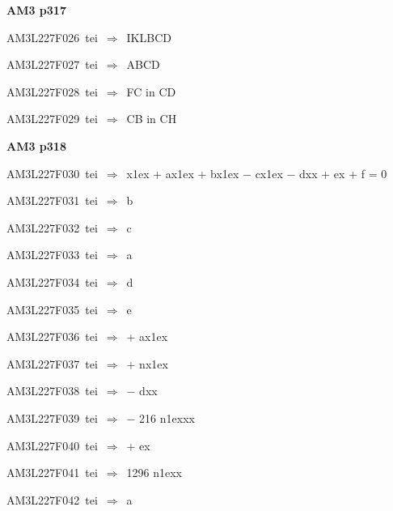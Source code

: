 \par\vfill\eject
{\bf\hfill AM3 p317\hfill\hbox{}}\par\bigskip
{\sixrm AM3L227F026\ {\sixit tei}\ }$\Rightarrow$\ IKLBCD\par\smallskip
{\sixrm AM3L227F027\ {\sixit tei}\ }$\Rightarrow$\ ABCD\par\smallskip
{\sixrm AM3L227F028\ {\sixit tei}\ }$\Rightarrow$\ FC {\tenit in} CD\par\smallskip
{\sixrm AM3L227F029\ {\sixit tei}\ }$\Rightarrow$\ CB {\tenit in} CH\par\smallskip

\par\vfill\eject
{\bf\hfill AM3 p318\hfill\hbox{}}\par\bigskip
{\sixrm AM3L227F030\ {\sixit tei}\ }$\Rightarrow$\ {\tenit x}\raise1ex\hbox{} + {\tenit ax}\raise1ex\hbox{} + {\tenit bx}\raise1ex\hbox{} − {\tenit cx}\raise1ex\hbox{} − {\tenit dxx} + {\tenit ex} + {\tenit f} = 0\par\smallskip
{\sixrm AM3L227F031\ {\sixit tei}\ }$\Rightarrow$\ {\tenit b}\par\smallskip
{\sixrm AM3L227F032\ {\sixit tei}\ }$\Rightarrow$\ {\tenit c}\par\smallskip
{\sixrm AM3L227F033\ {\sixit tei}\ }$\Rightarrow$\ {\tenit a}\par\smallskip
{\sixrm AM3L227F034\ {\sixit tei}\ }$\Rightarrow$\ {\tenit d}\par\smallskip
{\sixrm AM3L227F035\ {\sixit tei}\ }$\Rightarrow$\ {\tenit e}\par\smallskip
{\sixrm AM3L227F036\ {\sixit tei}\ }$\Rightarrow$\ + {\tenit ax}\raise1ex\hbox{}\par\smallskip
{\sixrm AM3L227F037\ {\sixit tei}\ }$\Rightarrow$\ + {\tenit nx}\raise1ex\hbox{}\par\smallskip
{\sixrm AM3L227F038\ {\sixit tei}\ }$\Rightarrow$\ − {\tenit dxx}\par\smallskip
{\sixrm AM3L227F039\ {\sixit tei}\ }$\Rightarrow$\ − 216 {\tenit n}\raise1ex\hbox{}{\tenit xx}\par\smallskip
{\sixrm AM3L227F040\ {\sixit tei}\ }$\Rightarrow$\ + {\tenit ex}\par\smallskip
{\sixrm AM3L227F041\ {\sixit tei}\ }$\Rightarrow$\ 1296 {\tenit n}\raise1ex\hbox{}{\tenit x}\par\smallskip
{\sixrm AM3L227F042\ {\sixit tei}\ }$\Rightarrow$\ {\tenit a}\par\smallskip
